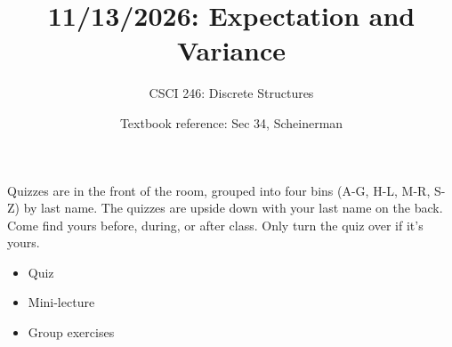 \documentclass[10pt]{beamer}
\begin{document}




\title{11/13/2026: Expectation and Variance}
\author{CSCI 246: Discrete Structures}
\date{Textbook reference: Sec 34, Scheinerman}

\begin{frame}
    \titlepage 
\end{frame}


\begin{frame}


\begin{mygreenbox}[title=Graded Quiz Pickup]
Quizzes are in the front of the room, grouped into four bins (A-G, H-L, M-R, S-Z) by last name. The quizzes are upside down with your last name on the back. Come find yours before, during, or after class.  Only turn the quiz over if it's yours.
\end{mygreenbox} 
\vfill
\begin{myyellowbox}[title=Today's Agenda]
\begin{itemize}
	\item Quiz
	\item Mini-lecture 
	\item Group exercises
\end{itemize}
\end{myyellowbox}
\vfill 

\end{frame}
\end{document}
